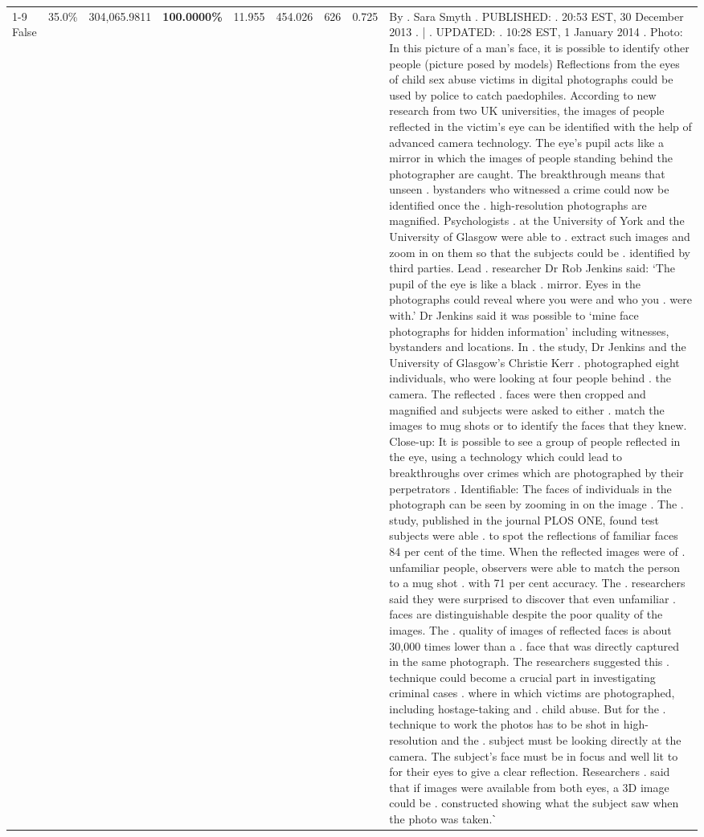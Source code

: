 \begin{table}[H]
\begin{tabular}{lllrlllll}
\cline{1-9}
False & 35.0\% & \color{red} 304,065.9811 & \bfseries \color{red} 100.0000\% & 11.955 & 454.026 & 626 & 0.725 & By . Sara Smyth . PUBLISHED: . 20:53 EST, 30 December 2013 . | . UPDATED: . 10:28 EST, 1 January 2014 . Photo: In this picture of a man's face, it is possible to identify other people (picture posed by models) Reflections from the eyes of child sex abuse victims in digital photographs could be used by police to catch paedophiles. According to new research from two UK universities, the images of people reflected in the victim's eye can be identified with the help of advanced camera technology. The eye's pupil acts like a mirror in which the images of people standing behind the photographer are caught. The breakthrough means that unseen . bystanders who witnessed a crime could now be identified once the . high-resolution photographs are magnified. Psychologists . at the University of York and the University of Glasgow were able to . extract such images and zoom in on them so that the subjects could be . identified by third parties. Lead . researcher Dr Rob Jenkins said: ‘The pupil of the eye is like a black . mirror. Eyes in the photographs could reveal where you were and who you . were with.' Dr Jenkins said it was possible to ‘mine face photographs for hidden information' including witnesses, bystanders and locations. In . the study, Dr Jenkins and the University of Glasgow's Christie Kerr . photographed eight individuals, who were looking at four people behind . the camera. The reflected . faces were then cropped and magnified and subjects were asked to either . match the images to mug shots or to identify the faces that they knew. Close-up: It is possible to see a group of people reflected in the eye, using a technology which could lead to breakthroughs over crimes which are photographed by their perpetrators . Identifiable: The faces of individuals in the photograph can be seen by zooming in on the image . The . study, published in the journal PLOS ONE, found test subjects were able . to spot the reflections of familiar faces 84 per cent of the time. When the reflected images were of . unfamiliar people, observers were able to match the person to a mug shot . with 71 per cent accuracy. The . researchers said they were surprised to discover that even unfamiliar . faces are distinguishable despite the poor quality of the images. The . quality of images of reflected faces is about 30,000 times lower than a . face that was directly captured in the same photograph. The researchers suggested this . technique could become a crucial part in investigating criminal cases . where in which victims are photographed, including hostage-taking and . child abuse. But for the . technique to work the photos has to be shot in high-resolution and the . subject must be looking directly at the camera. The subject's face must be in focus and well lit to for their eyes to give a clear reflection. Researchers . said that if images were available from both eyes, a 3D image could be . constructed showing what the subject saw when the photo was taken.ˋ \\

\end{tabular}
\end{table}
